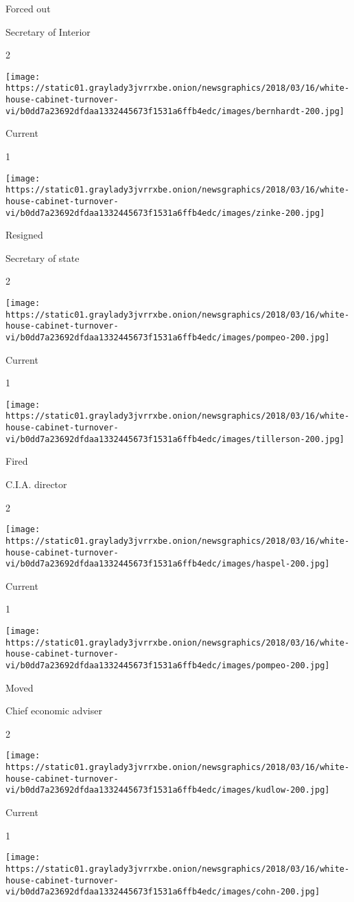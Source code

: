 Forced out

Secretary of Interior

2

\texttt{[image: https://static01.graylady3jvrrxbe.onion/newsgraphics/2018/03/16/white-house-cabinet-turnover-vi/b0dd7a23692dfdaa1332445673f1531a6ffb4edc/images/bernhardt-200.jpg]}

Current

1

\texttt{[image: https://static01.graylady3jvrrxbe.onion/newsgraphics/2018/03/16/white-house-cabinet-turnover-vi/b0dd7a23692dfdaa1332445673f1531a6ffb4edc/images/zinke-200.jpg]}

Resigned

Secretary of state

2

\texttt{[image: https://static01.graylady3jvrrxbe.onion/newsgraphics/2018/03/16/white-house-cabinet-turnover-vi/b0dd7a23692dfdaa1332445673f1531a6ffb4edc/images/pompeo-200.jpg]}

Current

1

\texttt{[image: https://static01.graylady3jvrrxbe.onion/newsgraphics/2018/03/16/white-house-cabinet-turnover-vi/b0dd7a23692dfdaa1332445673f1531a6ffb4edc/images/tillerson-200.jpg]}

Fired

C.I.A. director

2

\texttt{[image: https://static01.graylady3jvrrxbe.onion/newsgraphics/2018/03/16/white-house-cabinet-turnover-vi/b0dd7a23692dfdaa1332445673f1531a6ffb4edc/images/haspel-200.jpg]}

Current

1

\texttt{[image: https://static01.graylady3jvrrxbe.onion/newsgraphics/2018/03/16/white-house-cabinet-turnover-vi/b0dd7a23692dfdaa1332445673f1531a6ffb4edc/images/pompeo-200.jpg]}

Moved

Chief economic adviser

2

\texttt{[image: https://static01.graylady3jvrrxbe.onion/newsgraphics/2018/03/16/white-house-cabinet-turnover-vi/b0dd7a23692dfdaa1332445673f1531a6ffb4edc/images/kudlow-200.jpg]}

Current

1

\texttt{[image: https://static01.graylady3jvrrxbe.onion/newsgraphics/2018/03/16/white-house-cabinet-turnover-vi/b0dd7a23692dfdaa1332445673f1531a6ffb4edc/images/cohn-200.jpg]}

